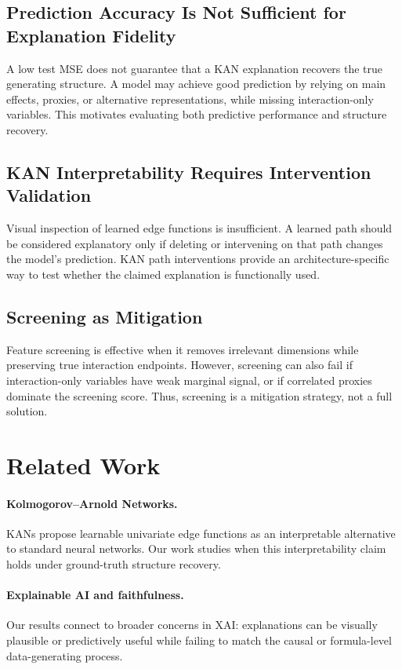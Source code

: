 \documentclass[11pt]{article}
\begin{document}
\subsection{Prediction Accuracy Is Not Sufficient for Explanation Fidelity}

A low test MSE does not guarantee that a KAN explanation recovers the true generating structure.
A model may achieve good prediction by relying on main effects, proxies, or alternative representations, while missing interaction-only variables.
This motivates evaluating both predictive performance and structure recovery.

\subsection{KAN Interpretability Requires Intervention Validation}

Visual inspection of learned edge functions is insufficient.
A learned path should be considered explanatory only if deleting or intervening on that path changes the model's prediction.
KAN path interventions provide an architecture-specific way to test whether the claimed explanation is functionally used.

\subsection{Screening as Mitigation}

Feature screening is effective when it removes irrelevant dimensions while preserving true interaction endpoints.
However, screening can also fail if interaction-only variables have weak marginal signal, or if correlated proxies dominate the screening score.
Thus, screening is a mitigation strategy, not a full solution.

\section{Related Work}

\paragraph{Kolmogorov--Arnold Networks.}
KANs propose learnable univariate edge functions as an interpretable alternative to standard neural networks.
Our work studies when this interpretability claim holds under ground-truth structure recovery.

\paragraph{Explainable AI and faithfulness.}
Our results connect to broader concerns in XAI: explanations can be visually plausible or predictively useful while failing to match the causal or formula-level data-generating process.
\end{document}
